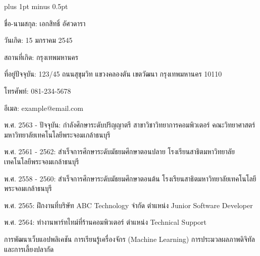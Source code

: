 
\clearpage
\thispagestyle{plain}

\begingroup
\fontsize{16pt}{19.2pt}\selectfont
\justifying
\XeTeXlinebreakskip=0pt plus 1pt minus 0.5pt
\setlength{\parindent}{1.5cm}
\setlength{\parskip}{0pt}

\par

\indent ชื่อ-นามสกุล: เอกสิทธิ์ อัศวดารา

\indent วันเกิด: 15 มกราคม 2545

\indent สถานที่เกิด: กรุงเทพมหานคร

\indent ที่อยู่ปัจจุบัน: 123/45 ถนนสุขุมวิท แขวงคลองตัน เขตวัฒนา กรุงเทพมหานคร 10110

\indent โทรศัพท์: 081-234-5678

\indent อีเมล: example@email.com

\par

\indent พ.ศ. 2563 - ปัจจุบัน: กำลังศึกษาระดับปริญญาตรี สาขาวิชาวิทยาการคอมพิวเตอร์
คณะวิทยาศาสตร์ มหาวิทยาลัยเทคโนโลยีพระจอมเกล้าธนบุรี

\indent พ.ศ. 2561 - 2562: สำเร็จการศึกษาระดับมัธยมศึกษาตอนปลาย
โรงเรียนสาธิตมหาวิทยาลัยเทคโนโลยีพระจอมเกล้าธนบุรี

\indent พ.ศ. 2558 - 2560: สำเร็จการศึกษาระดับมัธยมศึกษาตอนต้น
โรงเรียนสาธิตมหาวิทยาลัยเทคโนโลยีพระจอมเกล้าธนบุรี

\par

\indent พ.ศ. 2565: ฝึกงานที่บริษัท ABC Technology จำกัด
ตำแหน่ง Junior Software Developer

\indent พ.ศ. 2564: ทำงานพาร์ทไทม์ที่ร้านคอมพิวเตอร์
ตำแหน่ง Technical Support

\par

\indent การพัฒนาเว็บแอปพลิเคชัน การเรียนรู้เครื่องจักร (Machine Learning)
การประมวลผลภาพดิจิทัล และการเลี้ยงปลากัด

\par\endgroup
\clearpage

